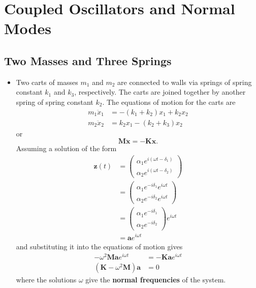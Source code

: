 \documentclass{article}
\renewcommand{\vec}[1]{\boldsymbol{\mathbf{#1}}}
\newcommand{\ddvec}[1]{\ddot{\vec{#1}}}
\begin{document}
\section{Coupled Oscillators and Normal Modes}

\subsection{Two Masses and Three Springs}

\begin{itemize}
  \item Two carts of masses $m_1$ and $m_2$ are connected to walls via springs of spring constant $k_1$ and $k_3$, respectively. The carts are joined together by another spring of spring constant $k_2$. The equations of motion for the carts are \begin{align*}
          m_1 \ddot{x}_1 & = -(k_1 + k_2) x_1 + k_2 x_2 \\
          m_2 \ddot{x}_2 & = k_2 x_1 - (k_2 + k_3) x_2
        \end{align*} or \[\vec{M} \ddvec{x} = -\vec{K} \vec{x}.\] Assuming a solution of the form \begin{align*}
          \vec{z}(t) & = \begin{pmatrix}
                           \alpha_1 e^{i (\omega t - \delta_1)} \\
                           \alpha_2 e^{i (\omega t - \delta_2)}
                         \end{pmatrix}    \\
                     & = \begin{pmatrix}
                           \alpha_1 e^{-i \delta_1} e^{i \omega t} \\
                           \alpha_2 e^{-i \delta_2} e^{i \omega t}
                         \end{pmatrix} \\
                     & = \begin{pmatrix}
                           \alpha_1 e^{-i \delta_1} \\
                           \alpha_2 e^{-i \delta_2}
                         \end{pmatrix} e^{i \omega t}            \\
                     & = \vec{a} e^{i \omega t}
        \end{align*} and substituting it into the equations of motion gives \begin{align*}
          -\omega^2 \vec{M} \vec{a} e^{i \omega t} & = -\vec{K} \vec{a} e^{i \omega t} \\
          (\vec{K} - \omega^2 \vec{M}) \vec{a}     & = 0
        \end{align*} where the solutions $\omega$ give the \textbf{normal frequencies} of the system.
\end{itemize}
\end{document}
